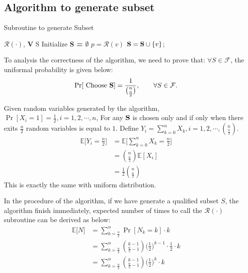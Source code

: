 \documentclass[a4paper, 12pt, titlepage]{article}
\begin{document}
\subsection{Algorithm to generate subset}

\begin{algorithm}[h]
    \caption{Subroutine to generate Subset}
    \begin{algorithmic}[1]
        \Require $\mathcal{R(\cdot)}$, {\bf V}
        \Ensure S
            \State Initialize {\bf S = $\emptyset$}
                    \State $ p = \mathcal R(v)$
                        \State ${\bf S} = {\bf S} \cup \{ v \}$;
                    \EndIf
                \EndFor
            \EndWhile
            \State {}
        \EndFunction
    \end{algorithmic}
\end{algorithm}


To analysis the correctness of the algorithm, we need to prove that:
$ \forall S \in \mathcal{F}$, the uniformal probability is given below:
\[
    \Pr [ \text{ Choose {\bf  S}} ] = \frac{1}{\binom{n}{\frac{n}{2}}}, \qquad \forall S \in \mathcal{F}.
\]

Given random variables generated by the algorithm, $\Pr [X_i = 1] = \frac{1}{2}, i = 1, 2, \cdots, n$, 
For any ${\bf S}$ is chosen only and if only when there exits $\frac{n}{2}$ random variables is equal to $1$.
Define $Y_i = \sum_{k = 0}^{n} X_{k}, i = 1, 2, \cdots, \binom{n}{\frac{n}{2}}$.
\begin{equation}
    \begin{aligned}
        \mathbb E \big[ Y_{i} = \frac{n}{2} \big] &= \mathbb E \big[ \sum_{k = 0}^{n} X_{k} = \frac{n}{2} \big] \\
                                                  &= \binom{n}{\frac{n}{2}} \mathbb E [X_i] \\
                                                  &= \frac{1}{2} \binom{n}{\frac{n}{2}} 
    \end{aligned}
\end{equation}
This is exactly the same with uniform distribution.

In the procedure of the algorithm, if we have generate a qualified subset $S$, the algorithm finish immediately, expected number of times
to call the $\mathcal{R(\cdot)}$ subroutine can be derived as below:
\begin{equation}
    \begin{aligned}
        \mathbb E \big[ N \big] &= \sum_{k = \frac{n}{2}}^{n} \Pr[ N_{k} = k] \cdot k \\
                                &= \sum_{k = \frac{n}{2}}^{n} \binom{k - 1}{\frac{n}{2} - 1} \big( \frac{1}{2} \big)^{k - 1} \cdot \frac{1}{2} \cdot k \\
                                &= \sum_{k = \frac{n}{2}}^{n} \binom{k - 1}{\frac{n}{2} - 1} \big( \frac{1}{2} \big)^{k} \cdot k \\
    \end{aligned}
\end{equation}
\end{document}
